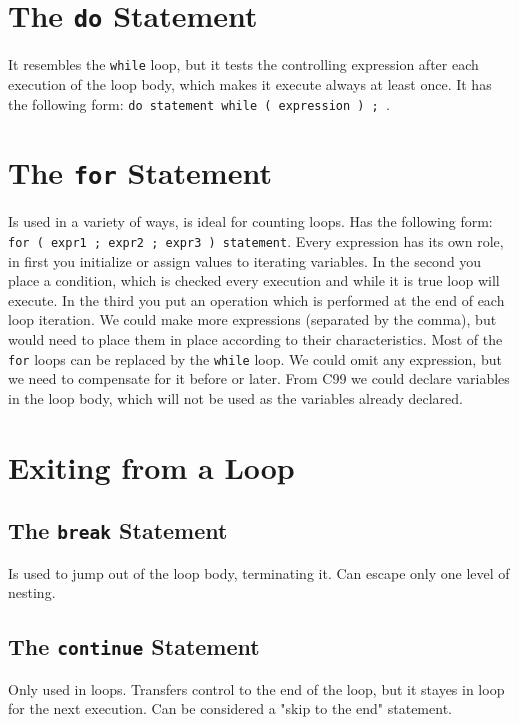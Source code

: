 \documentclass[12pt, openany]{book}
\begin{document}
    \section{The \texttt{do} Statement}
    It resembles the \texttt{while} loop, but it tests the controlling
    expression after each execution of the loop body, which makes it execute
    always at least once. It has the following form: \texttt{do statement
    while ( expression ) ; }.
    
    \section{The \texttt{for} Statement}
    Is used in a variety of ways, is ideal for counting loops. Has the following
    form: \texttt{for ( expr1 ; expr2 ; expr3 ) statement}. Every expression has
    its own role, in first you initialize or assign values to iterating variables.
    In the second you place a condition, which is checked every execution and while
    it is true loop will execute. In the third you put an operation which is performed
    at the end of each loop iteration. We could make more expressions (separated by
    the comma), but would need to place them in place according to their characteristics.
    Most of the \texttt{for} loops can be replaced by the \texttt{while} loop. We could
    omit any expression, but we need to compensate for it before or later. From C99
    we could declare variables in the loop body, which will not be used as the
    variables already declared.
    

    \section{Exiting from a Loop}

    \subsection{The \texttt{break} Statement}
    Is used to jump out of the loop body, terminating it. Can escape only one level
    of nesting.

    \subsection{The \texttt{continue} Statement}
    Only used in loops. Transfers control to the end of the loop, but it stayes in
    loop for the next execution. Can be considered a
    "skip to the end" statement.
\end{document}
